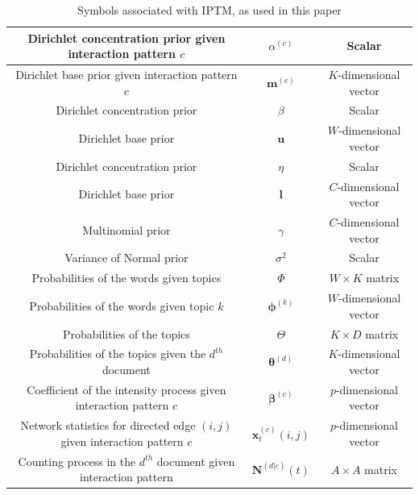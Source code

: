 \documentclass[a4paper]{article}
\begin{document}
\begin{table}[ht]
{\begin{tabular}{ |c|c|c|}
  			\hline 	
  			Dirichlet concentration prior given interaction pattern $c$&$\alpha^{(c)}$ & Scalar \\
  			\hline	
  			Dirichlet base prior given interaction pattern $c$&$\boldsymbol{m}^{(c)}$ & $K$-dimensional vector \\
  			\hline			
  			Dirichlet concentration prior&$\beta$ & Scalar \\
  			\hline			 
  			Dirichlet base prior&$\boldsymbol{u}$ & $W$-dimensional vector  \\
  			\hline				 	
  			Dirichlet concentration prior&$\eta$ & Scalar \\
  			\hline		
  			Dirichlet base prior&$\boldsymbol{l}$ & $C$-dimensional vector  \\
  			\hline			
  			Multinomial prior&$\gamma$ & $C$-dimensional vector \\
  			\hline
  			Variance of Normal prior&$\sigma^2$ & Scalar \\
  			\hline		
  			Probabilities of the words given topics &$\Phi$ & $W \times K$ matrix \\
  			\hline		
  			Probabilities of the words given topic $k$ &$\boldsymbol{\phi}^{(k)}$ & $W$-dimensional vector\\
  			\hline
  			Probabilities of the topics &$\Theta$ & $K \times D$ matrix \\
  			\hline		
  			Probabilities of the topics given the $d^{th}$ document &$\boldsymbol{\theta}^{(d)}$ & $K$-dimensional vector\\
  			\hline		
  			Coefficient of the intensity process given interaction pattern $c$ &$\boldsymbol{\beta}^{(c)}$ & $p$-dimensional vector\\
  			\hline		
  			Network statistics for directed edge $(i, j)$ given interaction pattern $c$ &$\boldsymbol{x}^{(c)}_t{(i,j)}$ & $p$-dimensional vector\\
  			\hline		
  			Counting process in the $d^{th}$ document given interaction pattern &	$\mathbf{N}^{(d|c)}(t)$ & $A\times A$ matrix\\
  			\hline
  			\hline
  		\end{tabular}}
  		\caption {Symbols associated with IPTM, as used in this paper}
  		\label{table:SymbolsIPTM}
  	\end{table}
  	\normalsize
\end{document}

